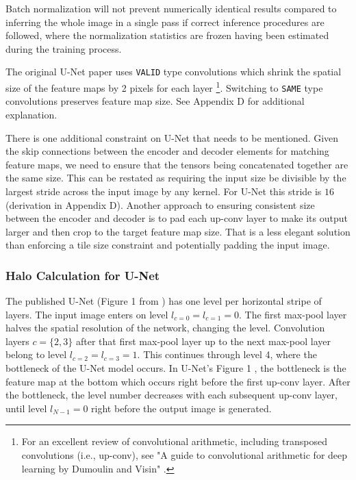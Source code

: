 \documentclass[twoside,11pt]{article}
\begin{document}
Batch normalization will not prevent numerically identical results compared to inferring the whole image in a single pass if correct inference procedures are followed, where the normalization statistics are frozen having been estimated during the training process.

The original U-Net paper uses \texttt{VALID} type convolutions which shrink the spatial size of the feature maps by 2 pixels for each layer \citep{Dumoulin2018}\footnote{For an excellent review of convolutional arithmetic, including transposed convolutions (i.e., up-conv), see "A guide to convolutional arithmetic for deep learning by Dumoulin and Visin" \citep{Dumoulin2018}.}. Switching to \texttt{SAME} type convolutions preserves feature map size. See Appendix D for additional explanation. 

There is one additional constraint on U-Net that needs to be mentioned. Given the skip connections between the encoder and decoder elements for matching feature maps, we need to ensure that the tensors being concatenated together are the same size. This can be restated as requiring the input size be divisible by the largest stride across the input image by any kernel. For U-Net this stride is $16$ (derivation in Appendix D). Another approach to ensuring consistent size between the encoder and decoder is to pad each up-conv layer to make its output larger and then crop to the target feature map size. That is a less elegant solution than enforcing a tile size constraint and potentially padding the input image.


\subsubsection{Halo Calculation for U-Net}

The published U-Net (Figure 1 from \citep{Ronneberger2015a}) has one level per horizontal stripe of layers. The input image enters on level $l_{c=0} = l_{c=1} = 0$. The first max-pool layer halves the spatial resolution of the network, changing the level. Convolution layers $c = \{2, 3\}$ after that first max-pool layer up to the next max-pool layer belong to level $l_{c=2}=l_{c=3} = 1$. This continues through level 4, where the bottleneck of the U-Net model occurs. In U-Net's Figure 1 \citep{Ronneberger2015a}, the bottleneck is the feature map at the bottom which occurs right before the first up-conv layer. After the bottleneck, the level number decreases with each subsequent up-conv layer, until level $l_{N-1} = 0$ right before the output image is generated. 
\end{document}
